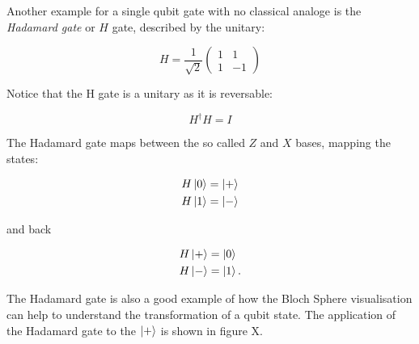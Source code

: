 Another example for a single qubit gate with no classical analoge is the
\textit{Hadamard gate} or $H$ gate, described by the unitary:

\begin{equation}
  H = \frac{1}{\sqrt{2}}
  \begin{pmatrix}
    1 & 1 \\
    1 & -1
  \end{pmatrix}
\end{equation}

Notice that the H gate is a unitary as it is reversable:

\begin{equation}
   H^{\dagger} H = I 
\end{equation}

The Hadamard gate maps between the so called $Z$ and $X$ bases, mapping the
states:

\begin{align}
  H \Ket{0} &= \Ket{+} \\
  H \Ket{1} &= \Ket{-}
\end{align}

and back

\begin{align}
  H \Ket{+} &= \Ket{0} \\
  H \Ket{-} &= \Ket{1}.
\end{align}

The Hadamard gate is also a good example of how the Bloch Sphere visualisation can help to understand the 
transformation of a qubit state. The application of the Hadamard gate to the $\Ket{+}$ is shown in figure X.


